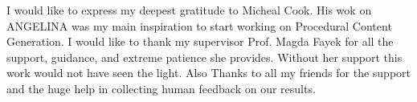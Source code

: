I would like to express my deepest gratitude to Micheal Cook. His wok on ANGELINA was my main inspiration to start working on Procedural Content Generation. I would like to thank my supervisor Prof. Magda Fayek for all the support, guidance, and extreme patience she provides. Without her support this work would not have seen the light. Also Thanks to all my friends for the support and the huge help in collecting human feedback on our results.